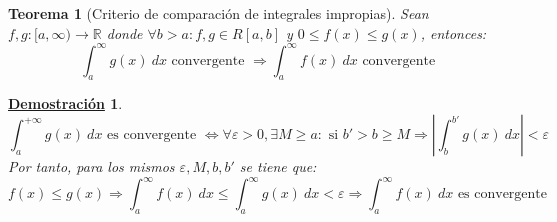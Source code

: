 \documentclass[10pt,a4paper,openright]{book}
\theoremstyle{break}
\newtheorem{theo}{Teorema}[chapter]
\newtheorem*{demo}{\underline{Demostración}}
\newcommand{\dif}[1]{\ d#1}
\begin{document}
\begin{theo}[Criterio de comparación de integrales impropias]
Sean $f,g: [a, \infty)\rightarrow \mathbb R$ donde $\forall b> a: f,g\in R[a,b]$ y $0\leq f(x)\leq g(x)$, entonces:
$$\int_{a}^{\infty} g(x) \dif{x} \mbox{ convergente }\Rightarrow \int_{a}^{\infty} f(x) \dif{x} \mbox{ convergente } $$
\end{theo}
\begin{demo}
$$\int_{a}^{+\infty} g(x) \dif{x}\mbox{ es convergente }\Leftrightarrow \forall \varepsilon > 0, \exists M \geq a: \mbox{ si } b'>b\geq M \Rightarrow \left| \int_{b}^{b'} g(x)\dif{x} \right|< \varepsilon $$
Por tanto, para los mismos $\varepsilon, M, b, b'$ se tiene que:
$$f(x)\leq g(x) \Rightarrow \int_{a}^{\infty} f(x) \dif{x} \leq \int_{a}^{\infty} g(x) \dif{x} < \varepsilon\Rightarrow \int_{a}^{\infty} f(x) \dif{x} \mbox{ es convergente}$$
\end{demo}
\end{document}
